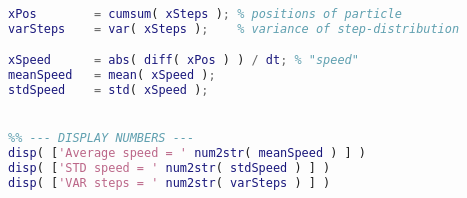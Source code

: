 \begin{lstlisting}[language=matlab]
%% --- CALCULATE POSITIONS AND SPEEDS ---
xPos        = cumsum( xSteps ); % positions of particle
varSteps    = var( xSteps );    % variance of step-distribution

xSpeed      = abs( diff( xPos ) ) / dt; % "speed"
meanSpeed   = mean( xSpeed );
stdSpeed    = std( xSpeed );


%% --- DISPLAY NUMBERS ---
disp( ['Average speed = ' num2str( meanSpeed ) ] )
disp( ['STD speed = ' num2str( stdSpeed ) ] )
disp( ['VAR steps = ' num2str( varSteps ) ] )

\end{lstlisting}